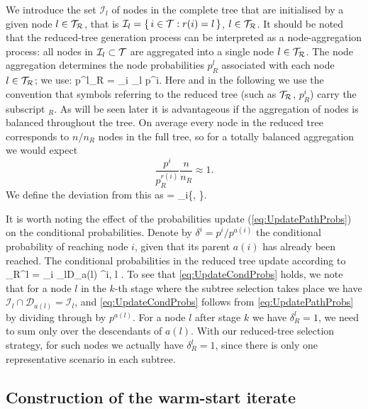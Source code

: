 We introduce the set $\mathcal{I}_l$ of nodes in the complete tree 
that are initialised by a given node $l\in\mathcal{T}_\mathcal{R}$, that is
$\mathcal{I}_l = \{\, i \in \mathcal{T} : r(i) = l \,\}$, $l \in \mathcal{T}_\mathcal{R}$.
It should be noted that the reduced-tree generation process can be
interpreted as a node-aggregation process: all nodes in
$\mathcal{I}_l\subset\mathcal{T}$ are aggregated into a single node $l\in\mathcal{T}_\mathcal{R}$.
The node aggregation determines the node probabilities $p_R^l$ associated
with each node $l\in\mathcal{T}_\mathcal{R}$; we use:
\be  \label{eq:UpdatePathProbs}
  p^l_R = \sum_{i \in {}_l} p^i.
\ee
Here and in the following we use the convention that symbols referring
to the reduced tree (such as $\mathcal{T}_\mathcal{R}$, $p_R^i$) carry the subscript $_R$.
As will be seen later it is advantageous if the aggregation of nodes
is balanced throughout the tree. On average every node in the reduced
tree corresponds to $n/n_R$ nodes in the full tree, so for
a totally balanced aggregation we would expect 
\[
  \frac{p^i}{p_R^{r(i)}}\frac{n}{n_R}\approx 1.
\]
We define the deviation from this as
\be  \label{eq:rho}
  \rho = \min_{i\in\Rtree}\left\{, 
                                 \right\}.
\ee

It is worth noting the effect of the probabilities update
(\ref{eq:UpdatePathProbs}) on the conditional probabilities.
Denote by $\delta^i = p^i/p^{a(i)}$ the conditional probability of
reaching node $i$, given that its parent $a(i)$ has already been
reached.
The conditional probabilities in the reduced tree update according to
\be  \label{eq:UpdateCondProbs}
  \delta_R^l = \!\!\! \sum_{i \in {}_l\cap D_{a(l)}} \!\!\! \delta^i,
  \quad l \in \Rtree.
\ee
To see that \eqref{eq:UpdateCondProbs} holds, we note that for a node $l$
in the $k$-th stage where the subtree selection takes place we have
$\mathcal{I}_l \cap \mathcal{D}_{a(l)} = \mathcal{I}_l$, and
\eqref{eq:UpdateCondProbs} follows from \eqref{eq:UpdatePathProbs}
by dividing through by $p^{a(l)}$.
For a node $l$ after stage $k$ we have $\delta_R^l = 1$, we need to sum
only over the descendants of $a(l)$.
With our reduced-tree selection strategy, for such nodes we actually
have $\delta_R^l = 1$, since there is only one representative scenario
in each subtree.

%
%
\subsection{Construction of the warm-start iterate}
\label{sec:Construction}

